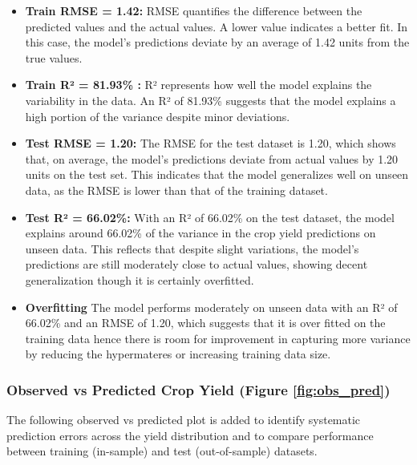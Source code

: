 \begin{itemize}
    
    
        \item \textbf{Train RMSE = 1.42:} RMSE quantifies the difference between the predicted values and the actual values. A lower value indicates a better fit. In this case, the model's predictions deviate by an average of 1.42 units from the true values.
        
        \item \textbf{Train R² = 81.93\% :} R² represents how well the model explains the variability in the data. An R² of 81.93\% suggests that the model explains a high portion of the variance despite minor deviations.
    
        \item \textbf{Test RMSE = 1.20:} The RMSE for the test dataset is 1.20, which shows that, on average, the model's predictions deviate from actual values by 1.20 units on the test set. This indicates that the model generalizes well on unseen data, as the RMSE is lower than that of the training dataset.
        
        \item \textbf{Test R² = 66.02\%:} With an R² of 66.02\% on the test dataset, the model explains around 66.02\% of the variance in the crop yield predictions on unseen data. This reflects that despite slight variations, the model's predictions are still moderately close to actual values, showing decent generalization though it is certainly overfitted.
    
    
    
        \item \textbf{Overfitting} The model performs moderately on unseen data with an R² of 66.02\% and an RMSE of 1.20, which suggests that it is over fitted on the training data hence there is room for improvement in capturing more variance by reducing the hypermateres or increasing training data size.
    
\end{itemize}



\subsubsection{Observed vs Predicted Crop Yield (Figure \ref{fig:obs_pred})}
The following observed vs predicted plot is added to identify systematic prediction errors across the yield distribution and to compare performance between training (in-sample) and test (out-of-sample) datasets.

